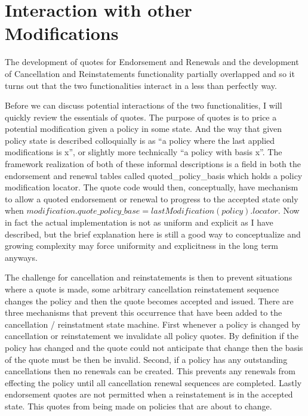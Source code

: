 \section{Interaction with other Modifications}
The development of quotes for Endorsement and Renewals and the development of Cancellation and Reinstatements functionality
partially overlapped and so it turns out that the two functionalities interact in a less than perfectly way.

Before we can discuss potential interactions of the two functionalities, I will quickly review the essentials of quotes. The
purpose of quotes is to price a potential modification given a policy in some state. And the way that given policy state is described
colloquially is as ``a policy where the last applied modifications is x'', or slightly more technically ``a policy with basis x''. The
framework realization of both of these informal descriptions is a field in both the endorsement and
renewal tables called quoted\_policy\_basis which holds a policy modification locator. The quote code would then, conceptually, have
mechanism to allow a quoted endorsement or renewal to progress to the accepted state only when
$ modification.quote\_policy\_base = lastModification(policy).locator $. Now in
fact the actual implementation is not as uniform and explicit as I have described, but the brief explanation here is still a good way
to conceptualize and growing complexity may force uniformity and explicitness in the long term anyways.

The challenge for cancellation and reinstatements is then to prevent situations where a quote is made, some arbitrary cancellation
reinstatement sequence changes the policy and then the quote becomes accepted and issued. There are three mechanisms that
prevent this occurrence that have been added to the cancellation / reinstatment state machine. First whenever a policy is
changed by cancellation or reinstatement we invalidate all policy quotes. By definition if the policy has changed and the quote
could not anticipate that change then the basis of the quote must be then be invalid. Second, if a policy has any outstanding
cancellations then no renewals can be created. This prevents any renewals from effecting the policy until all cancellation
renewal sequences are completed. Lastly endorsement quotes are not permitted when a reinstatement is in the accepted state. This
quotes from being made on policies that are about to change.

